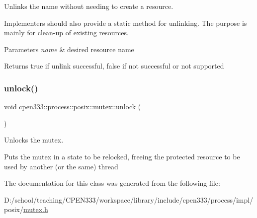 Unlinks the name without needing to create a resource. 

Implementers should also provide a static method for unlinking. The purpose is mainly for clean-\/up of existing resources.


\begin{DoxyParams}{Parameters}
{\em name} & desired resource name \\
\hline
\end{DoxyParams}
\begin{DoxyReturn}{Returns}
{\ttfamily true} if unlink successful, {\ttfamily false} if not successful or not supported 
\end{DoxyReturn}
\mbox{\label{classcpen333_1_1process_1_1posix_1_1mutex_a822e51a57ea9e5de1a052aeddf3e4e02}} 
\subsubsection{\texorpdfstring{unlock()}{unlock()}}
{\footnotesize\ttfamily void cpen333\+::process\+::posix\+::mutex\+::unlock (\begin{DoxyParamCaption}{ }\end{DoxyParamCaption})\hspace{0.3cm}{\ttfamily [inline]}}



Unlocks the mutex. 

Puts the mutex in a state to be relocked, freeing the protected resource to be used by another (or the same) thread 

The documentation for this class was generated from the following file\+:\begin{DoxyCompactItemize}
\item 
D\+:/school/teaching/\+C\+P\+E\+N333/workspace/library/include/cpen333/process/impl/posix/\hyperlink{impl_2posix_2mutex_8h}{mutex.\+h}\end{DoxyCompactItemize}
